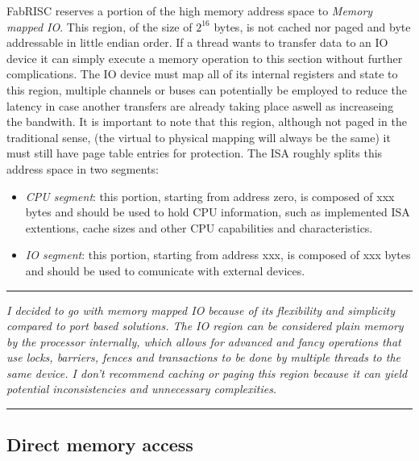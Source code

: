 \documentclass{article}
\begin{document}
            FabRISC reserves a portion of the high memory address space to \textit{Memory mapped IO}. This region, of the size of $2^{16}$ bytes, is not cached nor paged and byte addressable in little endian order. If a thread wants to transfer data to an IO device it can simply execute a memory operation to this section without further complications. The IO device must map all of its internal registers and state to this region, multiple channels or buses can potentially be employed to reduce the latency in case another transfers are already taking place aswell as increaseing the bandwith. It is important to note that this region, although not paged in the traditional sense, (the virtual to physical mapping will always be the same) it must still have page table entries for protection. The ISA roughly splits this address space in two segments:

            \begin{itemize}

                \item \textit{CPU segment}: this portion, starting from address zero, is composed of xxx bytes and should be used to hold CPU information, such as implemented ISA extentions, cache sizes and other CPU capabilities and characteristics.
                \item \textit{IO segment}: this portion, starting from address xxx, is composed of xxx bytes and should be used to comunicate with external devices.

            \end{itemize}

        \par\noindent\rule{\textwidth}{0.4pt}
        \textit{I decided to go with memory mapped IO because of its flexibility and simplicity compared to port based solutions. The IO region can be considered plain memory by the processor internally, which allows for advanced and fancy operations that use locks, barriers, fences and transactions to be done by multiple threads to the same device. I don't recommend caching or paging this region because it can yield potential inconsistencies and unnecessary complexities.}
        \par\noindent\rule{\textwidth}{0.4pt}


        \subsection{Direct memory access}
\end{document}
